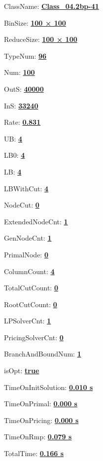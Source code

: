 \documentclass[11pt]{article}
\begin{document}
\pagestyle{empty}


ClassName: \underline{\textbf{Class_04.2bp-41}}
\par
BinSize: \underline{\textbf{100 × 100}}
\par
ReduceSize: \underline{\textbf{100 × 100}}
\par
TypeNum: \underline{\textbf{96}}
\par
Num: \underline{\textbf{100}}
\par
OutS: \underline{\textbf{40000}}
\par
InS: \underline{\textbf{33240}}
\par
Rate: \underline{\textbf{0.831}}
\par
UB: \underline{\textbf{4}}
\par
LB0: \underline{\textbf{4}}
\par
LB: \underline{\textbf{4}}
\par
LBWithCut: \underline{\textbf{4}}
\par
NodeCut: \underline{\textbf{0}}
\par
ExtendedNodeCnt: \underline{\textbf{1}}
\par
GenNodeCnt: \underline{\textbf{1}}
\par
PrimalNode: \underline{\textbf{0}}
\par
ColumnCount: \underline{\textbf{4}}
\par
TotalCutCount: \underline{\textbf{0}}
\par
RootCutCount: \underline{\textbf{0}}
\par
LPSolverCnt: \underline{\textbf{1}}
\par
PricingSolverCnt: \underline{\textbf{0}}
\par
BranchAndBoundNum: \underline{\textbf{1}}
\par
isOpt: \underline{\textbf{true}}
\par
TimeOnInitSolution: \underline{\textbf{0.010 s}}
\par
TimeOnPrimal: \underline{\textbf{0.000 s}}
\par
TimeOnPricing: \underline{\textbf{0.000 s}}
\par
TimeOnRmp: \underline{\textbf{0.079 s}}
\par
TotalTime: \underline{\textbf{0.166 s}}
\par
\newpage
\end{document}
